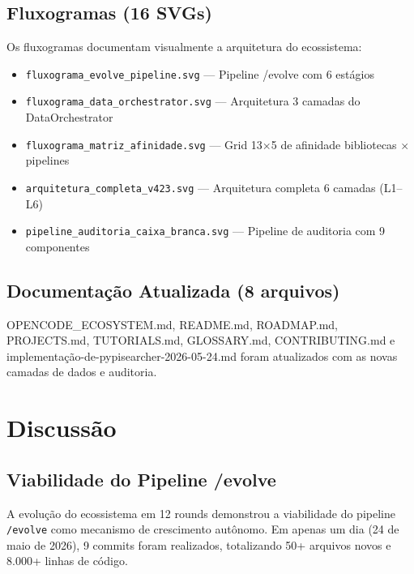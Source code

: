 \documentclass[12pt,a4paper]{article}
\begin{document}
\subsection{Fluxogramas (16 SVGs)}

Os fluxogramas documentam visualmente a arquitetura do ecossistema:

\begin{itemize}[itemsep=1pt]
  \item \texttt{fluxograma\_evolve\_pipeline.svg} --- Pipeline /evolve com 6 estágios
  \item \texttt{fluxograma\_data\_orchestrator.svg} --- Arquitetura 3 camadas do DataOrchestrator
  \item \texttt{fluxograma\_matriz\_afinidade.svg} --- Grid 13$\times$5 de afinidade bibliotecas $\times$ pipelines
  \item \texttt{arquitetura\_completa\_v423.svg} --- Arquitetura completa 6 camadas (L1--L6)
  \item \texttt{pipeline\_auditoria\_caixa\_branca.svg} --- Pipeline de auditoria com 9 componentes
\end{itemize}

\subsection{Documentação Atualizada (8 arquivos)}

OPENCODE\_ECOSYSTEM.md, README.md, ROADMAP.md, PROJECTS.md, TUTORIALS.md, GLOSSARY.md, CONTRIBUTING.md e implementação-de-pypisearcher-2026-05-24.md foram atualizados com as novas camadas de dados e auditoria.

\section{Discussão}

\subsection{Viabilidade do Pipeline /evolve}

A evolução do ecossistema em 12 rounds demonstrou a viabilidade do pipeline \texttt{/evolve} como mecanismo de crescimento autônomo. Em apenas um dia (24 de maio de 2026), 9 commits foram realizados, totalizando 50+ arquivos novos e 8.000+ linhas de código.
\end{document}
